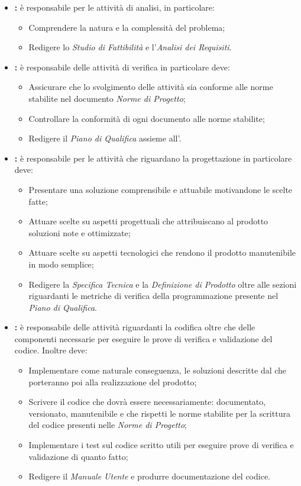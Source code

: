 \begin{itemize}
\item \textbf{\analyst:} è responsabile per le attività di analisi, in particolare:
	\begin{itemize}
	\item Comprendere la natura e la complessità del problema;
	\item Redigere lo \emph{Studio di Fattibilità} e l'\emph{Analisi dei Requisiti}.
	\end{itemize}
\item \textbf{\verifier:} è responsabile delle attività di verifica in particolare deve:
	\begin{itemize}
	\item Assicurare che lo svolgimento delle attività sia conforme alle norme stabilite nel documento \emph{Norme di Progetto};
	\item Controllare la conformità di ogni documento alle norme stabilite;
	\item Redigere il \emph{Piano di Qualifica} assieme all'\administrator.
	\end{itemize}
\item \textbf{\designer:} è responsabile per le attività che riguardano la progettazione in particolare deve:
	\begin{itemize}
	\item Presentare una soluzione comprensibile e attuabile motivandone le scelte fatte;
	\item Attuare scelte su aspetti progettuali che attribuiscano al prodotto soluzioni note e ottimizzate;
	\item Attuare scelte su aspetti tecnologici che rendono il prodotto manutenibile in modo semplice;
	\item Redigere la \emph{Specifica Tecnica} e la \emph{Definizione di Prodotto} oltre alle sezioni riguardanti le metriche di verifica della programmazione presente nel \emph{Piano di Qualifica}.
	\end{itemize}
\item \textbf{\programmer:} è responsabile delle attività riguardanti la codifica oltre che delle componenti necessarie per eseguire le prove di verifica e validazione del codice. Inoltre deve:
	\begin{itemize}
	\item Implementare come naturale conseguenza, le soluzioni descritte dal \designer{} che porteranno poi alla realizzazione del prodotto;
	\item Scrivere il codice che dovrà essere necessariamente: documentato, versionato, manutenibile e che rispetti le norme stabilite per la scrittura del codice presenti nelle \emph{Norme di Progetto};
	\item Implementare i test sul codice scritto utili per eseguire prove di verifica e validazione di quanto fatto;
	\item Redigere il \emph{Manuale Utente} e produrre documentazione del codice.
	\end{itemize}
\end{itemize}